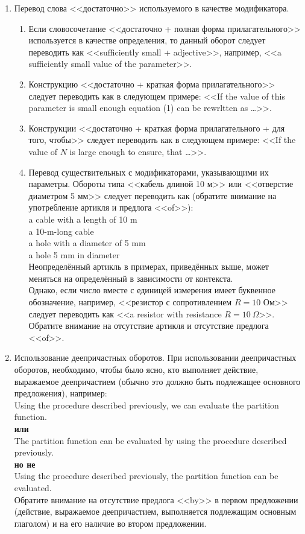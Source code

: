 \documentclass[a5paper, 10pt, twoside, numbers=enddot]{scrartcl}
\begin{document}
\begin{enumerate}
  \item Перевод слова <<достаточно>> используемого в качестве модификатора.
  \begin{enumerate}   
    \item Если словосочетание <<достаточно + полная форма прилагательного>> используется в качестве определения, то данный оборот следует переводить как <<sufficiently small + adjective>>, например, <<a sufficiently small value of the parameter>>.
    
    \item Конструкцию <<достаточно + краткая форма прилагательного>> следует переводить как в следующем примере: <<If the value of this parameter is small enough equation (1) can be rewrltten as \ldots>>.
    
    \item Конструкции <<достаточно + краткая форма прилагательного + для того, чтобы>> следует переводить как в следующем примере: <<If the value of $N$ is large enough to ensure, that \ldots>>.
    
    \item Перевод существительных с модификаторами, указывающими их параметры. Обороты типа <<кабель длиной 10 м>> или <<отверстие диаметром 5 мм>> следует переводить как (обратите внимание на употребление артикля и предлога <<of>>):\\ [4pt] \textsf{
    a cable with a length of 10 m\\
    a 10-m-long cable\\
    a hole with a diameter of 5 mm\\
    a hole 5 mm in diameter\\ [4pt]}
    Неопределённый артикль в примерах, приведённых выше, может меняться на определённый в зависимости от контекста.\\ [4pt]
    Однако, если число вместе с единицей измерения имеет буквенное обозначение, например, <<резистор с сопротивлением $R=10$ Ом>> следует переводить как <<a resistor with resistance $R=10\ \Omega$>>. Обратите внимание на отсутствие артикля и отсутствие предлога <<of>>.
  \end{enumerate}
    
  \item Использование деепричастных оборотов. При использовании  деепричастных оборотов, необходимо, чтобы было ясно, кто выполняет действие, выражаемое деепричастием (обычно это должно быть подлежащее основного предложения), например:\\ [4pt] \textsf{
  Using the procedure described previously, we can evaluate the partition function.\\ [4pt]
  \textbf{или}\\ [4pt]
  The partition function can be evaluated by using the procedure described previously.\\ [4pt]
  \textbf{но не}\\ [4pt]
  Using the procedure described previously, the partition function can be evaluated.\\ [4pt]}
  Обратите внимание на отсутствие предлога <<by>> в первом предложении (действие, выражаемое деепричастием, выполняется подлежащим основным глаголом) и на его наличие во втором предложении.
  

\end{enumerate}
\end{document}
